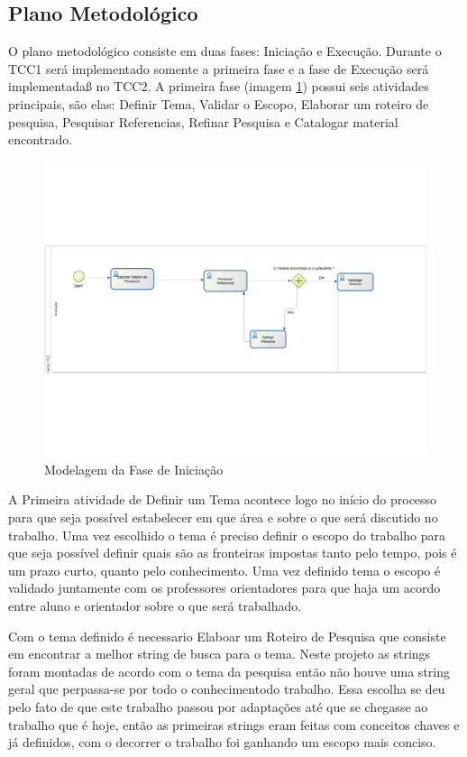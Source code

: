 \subsection{Plano Metodológico}
\label{plano_metodologico}
O plano metodológico consiste em duas fases: Iniciação e Execução. Durante o TCC1 será implementado somente a primeira fase e a fase de Execução será implementadaß no TCC2. A primeira fase (imagem \ref{img:iniciacao}) possui seis atividades principais, são elas: Definir Tema, Validar o Escopo, Elaborar um roteiro de pesquisa, Pesquisar Referencias, Refinar Pesquisa e Catalogar material encontrado.
\graphicspath{{figuras/}}
\begin{figure}[h]
\centering
\includegraphics[scale=0.40]{iniciacao}
\caption{Modelagem da Fase de Iniciação}
\label{img:iniciacao}
\end{figure}

A Primeira atividade de Definir um Tema acontece logo no início do processo para que seja possível estabelecer em que área e sobre o que será discutido no trabalho. Uma vez escolhido o tema é preciso definir o escopo do trabalho para que seja possível definir quais são as fronteiras impostas tanto pelo tempo, pois é um prazo curto, quanto pelo conhecimento. Uma vez definido tema o escopo é validado juntamente com os professores orientadores para que haja um acordo entre aluno e orientador sobre o que será trabalhado.

Com o tema definido é necessario Elaboar um Roteiro de Pesquisa  que consiste em encontrar a melhor string de busca para o tema. Neste projeto as strings foram montadas de acordo com o tema da pesquisa então não houve uma string geral que perpassa-se por todo o conhecimentodo trabalho. Essa escolha se deu pelo fato de que este trabalho passou por adaptações até que se chegasse ao trabalho que é hoje, então as primeiras strings eram feitas com conceitos chaves e já definidos, com o decorrer o trabalho foi ganhando um escopo mais conciso.

